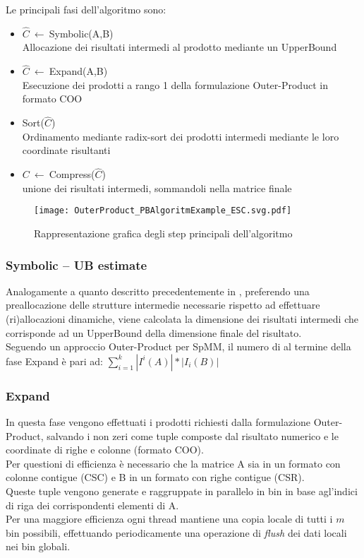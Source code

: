 Le principali fasi dell'algoritmo sono:
\begin{itemize}
	\item $\hat{C}~\leftarrow~$Symbolic(A,B) \\ Allocazione dei risultati intermedi al prodotto mediante un UpperBound
	\item $\hat{C}~\leftarrow~$Expand(A,B)	 \\ Esecuzione dei prodotti a rango 1 della formulazione Outer-Product in formato COO
	\item Sort($\hat{C}$) 					 \\ Ordinamento mediante radix-sort dei prodotti intermedi mediante le loro coordinate risultanti
	\item $C~\leftarrow~$Compress($\hat{C}$) \\ unione dei risultati intermedi, sommandoli nella matrice finale
\end{itemize}

\begin{figure}[H]
  \centering \texttt{[image: OuterProduct\_PBAlgoritmExample\_ESC.svg.pdf]}
  \caption[passi principali dell'algoritmo ESC-PropagationBlocking]{Rappresentazione grafica degli step principali dell'algoritmo}
  \decoRule \label{fig:OuterProduct_PBAlgoritmExample_ESC}
\end{figure}

\subsubsection{Symbolic -- UB estimate}
Analogamente a quanto descritto precedentemente in , 
preferendo una preallocazione delle strutture intermedie necessarie rispetto ad effettuare (ri)allocazioni dinamiche, 
viene calcolata la dimensione dei risultati intermedi che corrisponde ad un UpperBound della dimensione finale del risultato.\\
Seguendo un approccio Outer-Product per SpMM, il numero di \nnz al termine della fase Expand è pari ad:	$ \sum\limits_{i = 1}^k  | I^i(A) | *| I_i(B) | $ \\ %
 
\subsubsection{Expand}
In questa fase vengono effettuati i prodotti richiesti dalla formulazione Outer-Product, 
salvando i non zeri come tuple composte dal risultato numerico e le coordinate di righe e colonne (formato COO).\\
Per questioni di efficienza è necessario che la matrice A sia in un formato con colonne contigue (CSC) 
e B in un formato con righe contigue (CSR).\\
Queste tuple vengono generate e raggruppate in parallelo in bin in base agl'indici di riga dei corrispondenti elementi di A.\\
Per una maggiore efficienza ogni thread mantiene una copia locale di tutti i $m$ bin possibili, 
effettuando periodicamente una operazione di \emph{flush} dei dati locali nei bin globali.\\ 

